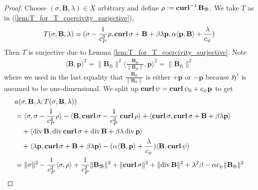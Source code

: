 \documentclass[../master_thesis.tex]{subfiles}
\begin{document}
\begin{proof}
    Choose $(\sigma, \mathbf{B},\lambda) \in X$ 
    arbitrary and define $\rho \vcentcolon= \veccurl^{-1} \mathbf{B}_{\mathfrak{B}}$.
    We take $T$ as in (\ref{lem:T_for_T_coercivity_surjective}),
    \begin{align*}
        T(\sigma, \mathbf{B},\lambda)
        = (\sigma - \frac{1}{c_P^2}\rho, \veccurl \sigma + \mathbf{B} + \beta \lambda\mathbf{p},
            \alpha \langle \mathbf{p},\mathbf{B} \rangle  + \frac{\lambda}{c_\psi} )
    \end{align*}
    Then $T$ is surjective due to Lemma \ref{lem:T_for_T_coercivity_surjective}. 
    Note 
    \begin{align*}
        \langle \mathbf{B}, \mathbf{p} \rangle ^ 2
        = \lVert \mathbf{B}_\mathfrak{H} \rVert^2  
            \langle \frac{\mathbf{B}_\mathfrak{H}}{\lVert \mathbf{B}_\mathfrak{H} \rVert}, \mathbf{p} \rangle ^ 2
        = \lVert \mathbf{B}_\mathfrak{H} \rVert^2
    \end{align*}
    where we used in the last equality that $\frac{\mathbf{B}_\mathfrak{H}}{\lVert \mathbf{B}_\mathfrak{H} \rVert}$
    is either $+\mathbf{p}$ or $-\mathbf{p}$ because $\mathfrak{H}^1$ is assumed to be one-dimensional.
    We split up $\veccurl\psi = \veccurl\psi_0 + c_\psi \mathbf{p}$ to get 
    \begin{align*}
        &a(\sigma, \mathbf{B},\lambda;T(\sigma, \mathbf{B},\lambda))
        \\ &=\langle \sigma, \sigma - \frac{1}{c_P^2} \rho \rangle 
            - \langle \mathbf{B}, \veccurl \sigma - \frac{1}{c_P^2}\veccurl \rho \rangle
            + \langle \veccurl \sigma , \veccurl \sigma + \mathbf{B} + \beta \lambda \mathbf{p} \rangle
        \\ &\quad + \langle \diver \mathbf{B}, \diver \veccurl \sigma 
            + \diver \mathbf{B} + \beta \lambda \diver \mathbf{p}\rangle
        \\ &\quad + \langle \lambda \mathbf{p}, \veccurl \sigma + \mathbf{B} + \beta \lambda \mathbf{p}\rangle
            - (\alpha \langle \mathbf{B}, \mathbf{p} \rangle + \frac{\lambda}{c_\psi})
            \langle \mathbf{B} , \veccurl\psi \rangle
        \\ &= \lVert \sigma \rVert^2 - \frac{1}{c_P^2} \langle \sigma , \rho \rangle 
            + \frac{1}{c_P^2} \lVert \mathbf{B}_\mathfrak{B} \rVert^2 + \lVert  \veccurl \sigma \rVert^2
            + \lVert \diver \mathbf{B} \rVert ^2 + \lambda ^2 \beta - \alpha c_\psi \lVert \mathbf{B}_\mathfrak{H} \rVert^2

\end{align*}
\end{proof}
\end{document}
